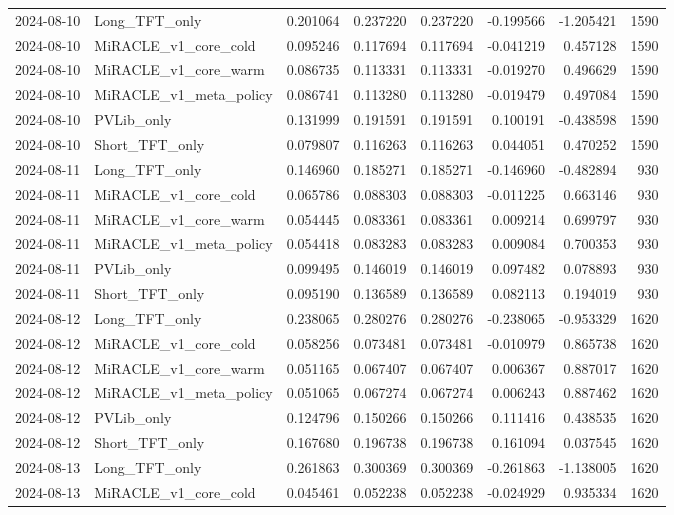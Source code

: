 \begin{tabular}{llrrrrrr}
2024-08-10 & Long_TFT_only & 0.201064 & 0.237220 & 0.237220 & -0.199566 & -1.205421 & 1590 \\
2024-08-10 & MiRACLE_v1_core_cold & 0.095246 & 0.117694 & 0.117694 & -0.041219 & 0.457128 & 1590 \\
2024-08-10 & MiRACLE_v1_core_warm & 0.086735 & 0.113331 & 0.113331 & -0.019270 & 0.496629 & 1590 \\
2024-08-10 & MiRACLE_v1_meta_policy & 0.086741 & 0.113280 & 0.113280 & -0.019479 & 0.497084 & 1590 \\
2024-08-10 & PVLib_only & 0.131999 & 0.191591 & 0.191591 & 0.100191 & -0.438598 & 1590 \\
2024-08-10 & Short_TFT_only & 0.079807 & 0.116263 & 0.116263 & 0.044051 & 0.470252 & 1590 \\
2024-08-11 & Long_TFT_only & 0.146960 & 0.185271 & 0.185271 & -0.146960 & -0.482894 & 930 \\
2024-08-11 & MiRACLE_v1_core_cold & 0.065786 & 0.088303 & 0.088303 & -0.011225 & 0.663146 & 930 \\
2024-08-11 & MiRACLE_v1_core_warm & 0.054445 & 0.083361 & 0.083361 & 0.009214 & 0.699797 & 930 \\
2024-08-11 & MiRACLE_v1_meta_policy & 0.054418 & 0.083283 & 0.083283 & 0.009084 & 0.700353 & 930 \\
2024-08-11 & PVLib_only & 0.099495 & 0.146019 & 0.146019 & 0.097482 & 0.078893 & 930 \\
2024-08-11 & Short_TFT_only & 0.095190 & 0.136589 & 0.136589 & 0.082113 & 0.194019 & 930 \\
2024-08-12 & Long_TFT_only & 0.238065 & 0.280276 & 0.280276 & -0.238065 & -0.953329 & 1620 \\
2024-08-12 & MiRACLE_v1_core_cold & 0.058256 & 0.073481 & 0.073481 & -0.010979 & 0.865738 & 1620 \\
2024-08-12 & MiRACLE_v1_core_warm & 0.051165 & 0.067407 & 0.067407 & 0.006367 & 0.887017 & 1620 \\
2024-08-12 & MiRACLE_v1_meta_policy & 0.051065 & 0.067274 & 0.067274 & 0.006243 & 0.887462 & 1620 \\
2024-08-12 & PVLib_only & 0.124796 & 0.150266 & 0.150266 & 0.111416 & 0.438535 & 1620 \\
2024-08-12 & Short_TFT_only & 0.167680 & 0.196738 & 0.196738 & 0.161094 & 0.037545 & 1620 \\
2024-08-13 & Long_TFT_only & 0.261863 & 0.300369 & 0.300369 & -0.261863 & -1.138005 & 1620 \\
2024-08-13 & MiRACLE_v1_core_cold & 0.045461 & 0.052238 & 0.052238 & -0.024929 & 0.935334 & 1620 \\

\end{tabular}
